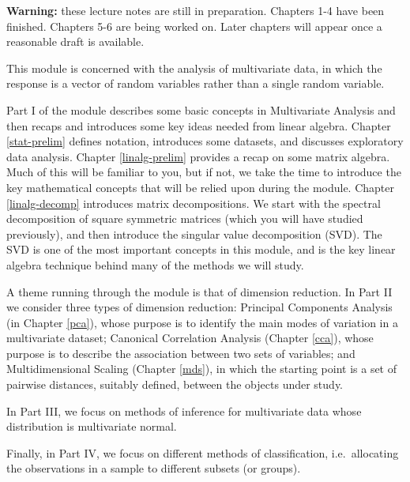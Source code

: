 \documentclass[]{book}
\theoremstyle{definition}
\theoremstyle{definition}
\theoremstyle{definition}
\theoremstyle{remark}
\begin{document}
\newcommand{\tcov}{\text{cov}}
\newcommand{\texp}{\text{exp}}
\newcommand{\lb}{\left(}
\newcommand{\rb}{\right)}
\newcommand{\lsb}{\left[}
\newcommand{\rsb}{\right]}
\newcommand{\BE}{{\mathbb{E}}}
\newcommand{\cov}{{\mathbb{C}\operatorname{ov}}}
\newcommand{\var}{{\mathbb{V}\operatorname{ar}}}
\newcommand{\cor}{{\mathbb{C}\operatorname{or}}}

\textbf{Warning:} these lecture notes are still in preparation. Chapters 1-4 have been finished. Chapters 5-6 are being worked on. Later chapters will appear once a reasonable draft is available.

This module is concerned with the analysis of multivariate data, in which the response is a vector of random variables rather than a single random variable.

Part I of the module describes some basic concepts in Multivariate Analysis and then recaps and introduces some key ideas needed from linear algebra.
Chapter \ref{stat-prelim} defines notation, introduces some datasets, and discusses exploratory data analysis. Chapter \ref{linalg-prelim} provides a recap on some matrix algebra. Much of this will be familiar to you, but if not, we take the time to introduce the key mathematical concepts that will be relied upon during the module. Chapter \ref{linalg-decomp} introduces matrix decompositions. We start with the spectral decomposition of square symmetric matrices (which you will have studied previously), and then introduce the singular value decomposition (SVD). The SVD is one of the most important concepts in this module, and is the key linear algebra technique behind many of the methods we will study.

A theme running through the module is that of dimension reduction. In Part II we consider three types of dimension reduction: Principal Components Analysis (in Chapter \ref{pca}),
whose purpose is to identify the main modes of variation in a multivariate dataset; Canonical Correlation Analysis (Chapter \ref{cca}), whose purpose is to describe the association between two sets of variables; and Multidimensional Scaling (Chapter \ref{mds}), in which the starting point is a set of pairwise distances, suitably defined, between the objects under study.

In Part III, we focus on methods of inference for multivariate data whose distribution is multivariate normal.

Finally, in Part IV, we focus on different methods of classification, i.e.~allocating the observations in a sample to different subsets (or groups).
\end{document}
